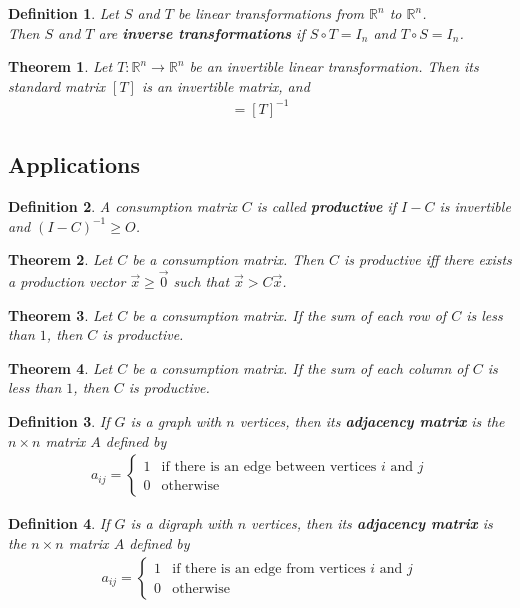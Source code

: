 \documentclass{article}
\theoremstyle{sltheorem}
\newtheorem{definition}{Definition}[section]
\newtheorem{theorem}{Theorem}[section]
\begin{document}
\begin{definition}
    Let $S$ and $T$ be linear transformations from $\mathbb{R}^n$ to $\mathbb{R}^n$.\\ 
    Then $S$ and $T$ are \textbf{inverse transformations} if $S\circ T= I_n$ and $T\circ S=I_n$.
\end{definition}
\begin{theorem}
    Let $T:\mathbb{R}^n\to\mathbb{R}^n$ be an invertible linear transformation. Then its standard matrix $[T]$ is an invertible matrix, and
    \begin{gather*}
        [T^{-1}] = [T]^{-1}
    \end{gather*}
\end{theorem}
\subsection{Applications}
\begin{definition}
    A consumption matrix $C$ is called \textbf{productive} if $I-C$ is invertible and $(I-C)^{-1}\geq O$.
\end{definition}
\begin{theorem}
    Let $C$ be a consumption matrix. Then $C$ is productive iff there exists a production vector $\vec x \geq \vec 0$ such that $\vec x > C\vec x$.
\end{theorem}
\begin{theorem}
    Let $C$ be a consumption matrix. If the sum of each row of $C$ is less than $1$, then $C$ is productive.
\end{theorem}
\begin{theorem}
    Let $C$ be a consumption matrix. If the sum of each column of $C$ is less than $1$, then $C$ is productive.
\end{theorem}
\begin{definition}
    If $G$ is a graph with $n$ vertices, then its \textbf{adjacency matrix} is the $n\times n$ matrix $A$ defined by
    \begin{gather*}
        a_{ij} = \begin{cases}
            1 &\text{if there is an edge between vertices $i$ and $j$}\\
            0 &\text{otherwise}
        \end{cases}
    \end{gather*}
\end{definition}
\begin{definition}
    If $G$ is a digraph with $n$ vertices, then its \textbf{adjacency matrix} is the $n\times n$ matrix $A$ defined by
    \begin{gather*}
        a_{ij} = \begin{cases}
            1 &\text{if there is an edge from vertices $i$ and $j$}\\
            0 &\text{otherwise}
        \end{cases}
    \end{gather*}
\end{definition}
\end{document}
